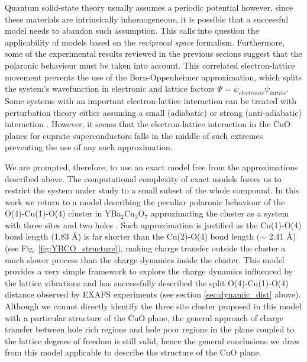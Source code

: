 
Quantum solid-state theory usually assumes a periodic potential however, since these materials are intrinsically inhomogeneous, it is possible that a successful model needs to abandon such assumption. 
This calls into question the applicability of models based on the \textit{reciprocal space} formalism.
Furthermore, some of the experimental results reviewed in the previous secions suggest that the polaronic behaviour must be taken into account.
This correlated electron-lattice movement prevents the use of the Born-Oppenheimer approximation, which splits the system's wavefunction in electronic and lattice factors $\Psi = \psi_{electronic}\psi_{lattice}$.
Some systems with an important electron-lattice interaction can be treated with perturbation theory either assuming a small (adiabatic) or strong (anti-adiabatic) interaction \cite{?}. 
However, it seems that the electron-lattice interaction in the CuO planes for cuprate superconductors falls in the middle of such extremes \cite{MustredeLeon1992} preventing the use of any such approximation.

We are prompted, therefore, to use an exact model free from the approximations described above. 
The computational complexity of exact models forces us to restrict the system under study to a small subset of the whole compound.
In this work we return to a model describing the peculiar polaronic behaviour of the O(4)-Cu(1)-O(4) cluster in YBa$_{2}$Cu$_{3}$O$_{7}$ approximating the cluster as a system with three sites and two holes \cite{MustredeLeon1992}.
Such approximation is justified as the Cu(1)-O(4) bond length (1.83 \AA) is far shorter than the Cu(2)-O(4) bond length ($\sim$ 2.41 \AA) (see Fig. \ref{fig:YBCO_structure}), making charge transfer outside the cluster a much slower process than the charge dynamics inside the cluster. 
This model provides a very simple framework to explore the charge dynamics influenced by the lattice vibrations and has successfully described the split O(4)-Cu(1)-O(4) distance observed by EXAFS experiments (see section \ref{sec:dynamic_dist} above).
Although we cannot directly identify the three site cluster proposed in this model with a particular structure of the CuO plane, the general approach of charge transfer between hole rich regions and hole poor regions in the plane coupled to the lattice degrees of freedom is still valid, hence the general conclusions we draw from this model applicable to describe the structure of the CuO plane.


